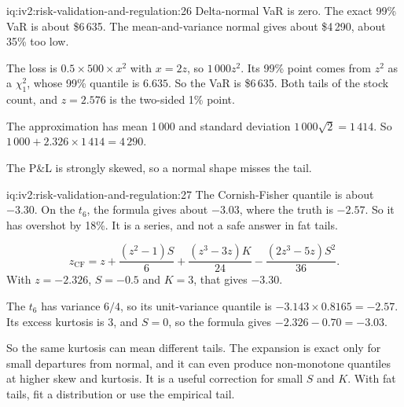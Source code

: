 \begin{solution}{iq:iv2:risk-validation-and-regulation:26}
Delta-normal VaR is zero. The exact 99\% VaR is about \$6\,635. The mean-and-variance normal gives about \$4\,290, about 35\% too low.

The loss is $0.5 \times 500 \times x^2$ with $x = 2z$, so $1\,000 z^2$. Its 99\% point comes from $z^2$ as a $\chi^2_1$, whose 99\% quantile is $6.635$. So the VaR is \$6\,635. Both tails of the stock count, and $z = 2.576$ is the two-sided 1\% point.

The approximation has mean 1\,000 and standard deviation $1\,000\sqrt{2} = 1\,414$. So $1\,000 + 2.326 \times 1\,414 = 4\,290$.

The P\&L is strongly skewed, so a normal shape misses the tail.

\end{solution}

\begin{solution}{iq:iv2:risk-validation-and-regulation:27}
The Cornish-Fisher quantile is about $-3.30$. On the $t_6$, the formula gives about $-3.03$, where the truth is $-2.57$. So it has overshot by 18\%. It is a series, and not a safe answer in fat tails.

\[
z_{\mathrm{CF}} = z + \frac{(z^2 - 1)S}{6} + \frac{(z^3 - 3z)K}{24} - \frac{(2z^3 - 5z)S^2}{36}.
\]
With $z = -2.326$, $S = -0.5$ and $K = 3$, that gives $-3.30$.

The $t_6$ has variance $6/4$, so its unit-variance quantile is $-3.143 \times 0.8165 = -2.57$. Its excess kurtosis is 3, and $S = 0$, so the formula gives $-2.326 - 0.70 = -3.03$.

So the same kurtosis can mean different tails. The expansion is exact only for small departures from normal, and it can even produce non-monotone quantiles at higher skew and kurtosis. It is a useful correction for small $S$ and $K$. With fat tails, fit a distribution or use the empirical tail.

\end{solution}

